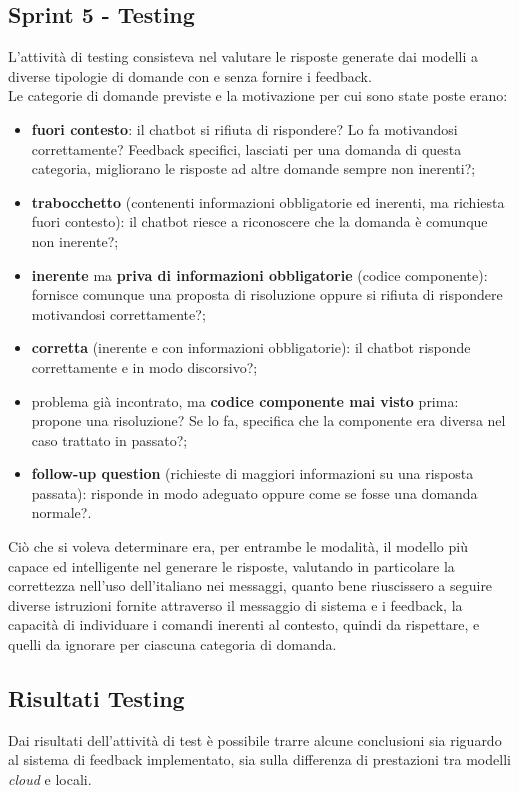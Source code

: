 \subsection{Sprint 5 - Testing}
L'attività di testing consisteva nel valutare le risposte generate dai modelli a diverse tipologie di domande con e senza fornire i feedback.\\
Le categorie di domande previste e la motivazione per cui sono state poste erano:
\begin{itemize}
    \item \textbf{fuori contesto}: il chatbot si rifiuta di rispondere? Lo fa motivandosi correttamente? Feedback specifici, lasciati per una domanda di questa categoria, migliorano le risposte ad altre domande sempre non inerenti?;
    \item \textbf{trabocchetto} (contenenti informazioni obbligatorie ed inerenti, ma richiesta fuori contesto): il chatbot riesce a riconoscere che la domanda è comunque non inerente?;
    \item \textbf{inerente} ma \textbf{priva di informazioni obbligatorie} (codice componente): fornisce comunque una proposta di risoluzione oppure si rifiuta di rispondere motivandosi correttamente?;
    \item \textbf{corretta} (inerente e con informazioni obbligatorie): il chatbot risponde correttamente e in modo discorsivo?;
    \item problema già incontrato, ma \textbf{codice componente mai visto} prima: propone una risoluzione? Se lo fa, specifica che la componente era diversa nel caso trattato in passato?;
    \item \textbf{follow-up question} (richieste di maggiori informazioni su una risposta passata): risponde in modo adeguato oppure come se fosse una domanda normale?.
\end{itemize}
Ciò che si voleva determinare era, per entrambe le modalità, il modello più capace ed intelligente nel generare le risposte, valutando in particolare la correttezza nell'uso dell'italiano nei messaggi, quanto bene riuscissero a seguire diverse istruzioni fornite attraverso il messaggio di sistema e i feedback, la capacità di individuare i comandi inerenti al contesto, quindi da rispettare, e quelli da ignorare per ciascuna categoria di domanda.

\subsection{Risultati Testing}
Dai risultati dell'attività di test è possibile trarre alcune conclusioni sia riguardo al sistema di feedback implementato, sia sulla differenza di prestazioni tra modelli \textit{cloud} e locali.\\

